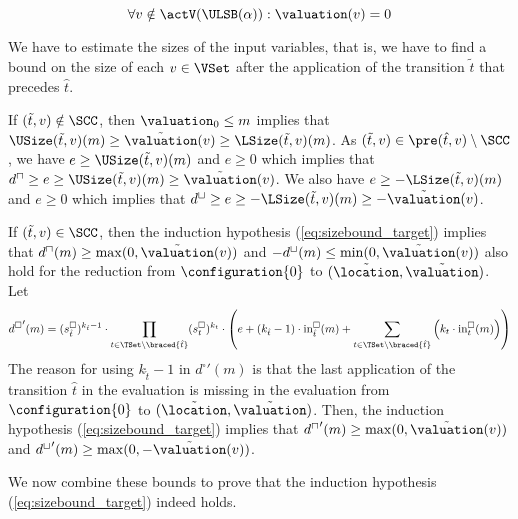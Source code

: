 \begin{equation} \label{eq:nonactiveequalzero}
  \forall v \notin \actV(\ULSB(\alpha)): \valuation(v) = 0
\end{equation}

We have to estimate the sizes of the input variables,
that is, we have to find a bound on the size of each $v \in \VSet$ after the application of the transition $\tilde{t}$ that precedes $\hat{t}$.

If $(\tilde{t}, v) \notin \SCC$, then $\valuation_0 \leq m$ implies that $\USize(\tilde{t}, v)(m) \geq \tilde{\valuation}(v) \geq \LSize(\tilde{t}, v)(m)$.
As $(\tilde{t}, v) \in \pre(\hat{t}, v) \setminus \SCC$, we have $e \geq \USize(\tilde{t}, v)(m)$ and $e \geq 0$ which implies that $d^\sqcap \geq e \geq \USize(\tilde{t}, v)(m) \geq \tilde{\valuation}(v)$.
We also have $e \geq -\LSize(\tilde{t}, v)(m)$ and $e \geq 0$ which implies that $d^\sqcup \geq e \geq -\LSize(\tilde{t}, v)(m) \geq -\tilde{\valuation}(v)$.

If $(\tilde{t}, v) \in \SCC$, then the induction hypothesis (\ref{eq:sizebound_target}) implies that $d^\sqcap(m) \geq \max(0, \tilde{\valuation}(v))$ and $-d^\sqcup(m) \leq \min(0, \tilde{\valuation}(v))$ also hold for the reduction from $\configuration{0}$ to $(\tilde{\location}, \tilde{\valuation})$.
Let
\begin{equation} \label{eq:induction_consequence}
  {d^\square}'(m) = (s^\square_{\hat{t}})^{k_{\hat{t}} - 1} \cdot \prod_{t \in \TSet \setminus \braced{\hat{t}}} (s^\square_t)^{k_t} \cdot \left( e + \left( k_{\hat{t}} - 1 \right) \cdot \text{in}^\square_{\hat{t}}(m) + \sum_{t \in \TSet \setminus \braced{\hat{t}}} \left( k_t \cdot \text{in}^\square_t(m) \right) \right)
\end{equation}
The reason for using $k_{\hat{t}} - 1$ in ${d^\square}'(m)$ is that the last application of the transition $\hat{t}$ in the evaluation is missing in the evaluation from $\configuration{0}$ to $(\tilde{\location}, \tilde{\valuation})$.
Then, the induction hypothesis (\ref{eq:sizebound_target}) implies that ${d^\sqcap}'(m) \geq \max(0, \tilde{\valuation}(v))$ and ${d^\sqcup}'(m) \geq \max(0, -\tilde{\valuation}(v))$.

We now combine these bounds to prove that the induction hypothesis (\ref{eq:sizebound_target}) indeed holds.

